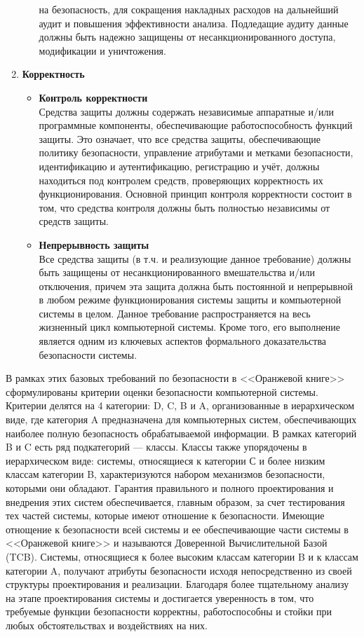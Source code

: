 \begin{enumerate}
\begin{itemize}
		на безопасность, для сокращения накладных расходов на дальнейший аудит и повышения эффективности анализа. Подледащие аудиту данные должны быть надежно защищены от несанкционированного 
		доступа, модификации и уничтожения.
	\end{itemize}
	\item \textbf{Корректность}
	\begin{itemize}
		\item \textbf{Контроль корректности}\\
		Средства защиты должны содержать независимые аппаратные и/или программные компоненты, обеспечивающие работоспособность функций защиты. Это означает, что все средства защиты, 
		обеспечивающие политику безопасности, управление атрибутами и метками безопасности, идентификацию и аутентификацию, регистрацию и учёт, должны находиться под контролем средств, 
		проверяющих корректность их функционирования. Основной принцип контроля корректности состоит в том, что средства контроля должны быть полностью независимы от средств защиты.
		\item \textbf{Непрерывность защиты}\\
		Все средства защиты (в т.ч. и реализующие данное требование) должны быть защищены от несанкционированного вмешательства и/или отключения, причем эта защита должна быть постоянной 
		и непрерывной в любом режиме функционирования системы защиты и компьютерной системы в целом. Данное требование распространяется на весь жизненный цикл компьютерной системы. 
		Кроме того, его выполнение является одним из ключевых аспектов формального доказательства безопасности системы.
	\end{itemize}
\end{enumerate}

В рамках этих базовых требований по безопасности в <<Оранжевой книге>> сформулированы критерии оценки безопасности компьютерной системы. Критерии делятся на 4 категории: D, C, B и A,
организованные в иерархическом виде, где категория A предназначена для компьютерных систем, обеспечивающих наиболее полную безопасность обрабатываемой информации. В рамках категорий B и C
есть ряд подкатегорий --- классы. Классы также упорядочены в иерархическом виде: системы, относящиеся к категории С и более низким классам категории B, характеризуются набором механизмов
безопасности, которыми они обладают. Гарантия правильного и полного проектирования и внедрения этих систем обеспечивается, главным образом, за счет тестирования тех частей системы, 
которые имеют отношение к безопасности. Имеющие отнощение к безопасности всей системы и ее обеспечивающие части системы в <<Оранжевой книге>> и называются Доверенной Вычислительной Базой (TCB). 
Системы, относящиеся к более высоким классам категории B и к классам категории A, получают атрибуты безопасности исходя непосредственно из своей структуры проектирования и реализации.
Благодаря более тщательному анализу на этапе проектирования системы и достигается уверенность в том, что требуемые функции безопасности корректны, работоспособны и стойки при 
любых обстоятельствах и воздействиях на них.


